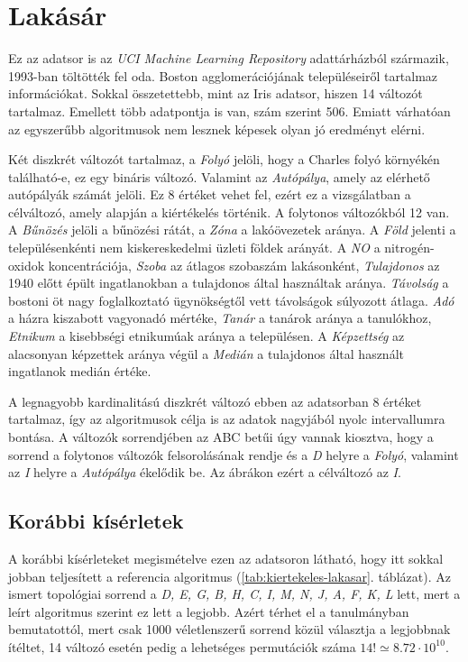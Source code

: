 \section{Lakásár}
Ez az adatsor is az \emph{UCI Machine Learning Repository} adattárházból származik, 1993-ban töltötték fel oda. Boston agglomerációjának településeiről tartalmaz információkat. Sokkal összetettebb, mint az Iris adatsor, hiszen 14 változót tartalmaz. Emellett több adatpontja is van, szám szerint 506. Emiatt várhatóan az egyszerűbb algoritmusok nem lesznek képesek olyan jó eredményt elérni.

Két diszkrét változót tartalmaz, a \emph{Folyó} jelöli, hogy a Charles folyó környékén található-e, ez egy bináris változó. Valamint az \emph{Autópálya}, amely az elérhető autópályák számát jelöli. Ez 8 értéket vehet fel, ezért ez a vizsgálatban a célváltozó, amely alapján a kiértékelés történik. A folytonos változókból 12 van. A \emph{Bűnözés} jelöli a bűnözési rátát, a \emph{Zóna} a lakóövezetek aránya. A \emph{Föld} jelenti a településenkénti nem kiskereskedelmi üzleti földek arányát. A \emph{NO} a nitrogén-oxidok koncentrációja, \emph{Szoba} az átlagos szobaszám lakásonként, \emph{Tulajdonos} az 1940 előtt épült ingatlanokban a tulajdonos által használtak aránya. \emph{Távolság} a bostoni öt nagy foglalkoztató ügynökségtől vett távolságok súlyozott átlaga. \emph{Adó} a házra kiszabott vagyonadó mértéke, \emph{Tanár} a tanárok aránya a tanulókhoz, \emph{Etnikum} a kisebbségi etnikumúak aránya a településen. A \emph{Képzettség} az alacsonyan képzettek aránya végül a \emph{Medián} a tulajdonos által használt ingatlanok medián értéke.

A legnagyobb kardinalitású diszkrét változó ebben az adatsorban 8 értéket tartalmaz, így az algoritmusok célja is az adatok nagyjából nyolc intervallumra bontása. A változók sorrendjében az ABC betűi úgy vannak kiosztva, hogy a sorrend a folytonos változók felsorolásának rendje és a \emph{D} helyre a \emph{Folyó}, valamint az \emph{I} helyre a \emph{Autópálya} ékelődik be. Az ábrákon ezért a célváltozó az \emph{I}.

\subsection{Korábbi kísérletek}
A korábbi kísérleteket megismételve ezen az adatsoron látható, hogy itt sokkal jobban teljesített a referencia algoritmus (\ref{tab:kiertekeles-lakasar}. táblázat). Az ismert topológiai sorrend a \emph{D, E, G, B, H, C, I, M, N, J, A, F, K, L} lett, mert a leírt algoritmus szerint ez lett a legjobb. Azért térhet el a tanulmányban bemutatottól, mert csak 1000 véletlenszerű sorrend közül választja a legjobbnak ítéltet, 14 változó esetén pedig a lehetséges permutációk száma $14! \simeq 8.72 \cdot 10^{10}$.

